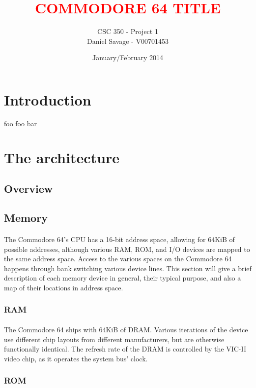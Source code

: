 \documentclass{article}
\title{\textcolor{red}{COMMODORE 64 TITLE}}
\author{CSC 350 - Project 1 \\ Daniel Savage - V00701453}
\date{January/February 2014}
\begin{document}
   \maketitle
   
\pagebreak{}

\tableofcontents

\pagebreak{}
   
\section{Introduction}
foo foo bar

\section{The architecture}

\subsection{Overview}

\subsection{Memory}
\paragraph{}
The Commodore 64's CPU has a 16-bit address space, allowing for 64KiB of possible addresses, although various RAM, ROM, and I/O devices are mapped to the same address space. Access to the various spaces on the Commodore 64 happens through bank switching various device lines. This section will give a brief description of each memory device in general, their typical purpose, and also a map of their locations in address space.

\subsubsection{RAM}
\paragraph{}
The Commodore 64 ships with 64KiB of DRAM. Various iterations of the device use different chip layouts from different manufacturers, but are otherwise functionally identical. The refresh rate of the DRAM is controlled by the VIC-II video chip, as it operates the system bus' clock.

\subsubsection{ROM}
\end{document}

